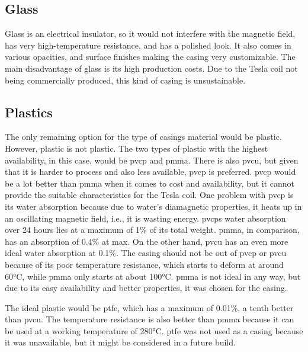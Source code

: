 \subsection{Glass}

Glass is an electrical insulator, so it would not interfere with the magnetic field, has very high-temperature resistance, and has a polished look. It also comes in various opacities, and surface finishes making the casing very customizable. The main disadvantage of glass is its high production costs. Due to the Tesla coil not being commercially produced, this kind of casing is unsustainable.

\subsection{Plastics}

The only remaining option for the type of casings material would be plastic. However, plastic is not plastic. The two types of plastic with the highest availability, in this case, would be \gls{pvcp} and \gls{pmma}. There is also \gls{pvcu}, but given that it is harder to process and also less available, \gls{pvcp} is preferred. \gls{pvcp} would be a lot better than \gls{pmma} when it comes to cost and availability, but it cannot provide the suitable characteristics for the Tesla coil. One problem with \gls{pvcp} is its water absorption because due to water's diamagnetic properties, it heats up in an oscillating magnetic field, i.e., it is wasting energy. \gls{pvcp}s water absorption over 24 hours lies at a maximum of 1\% of its total weight. \gls{pmma}, in comparison, has an absorption of 0.4\% at max. On the other hand, \gls{pvcu} has an even more ideal water absorption at 0.1\%. The casing should not be out of \gls{pvcp} or \gls{pvcu} because of its poor temperature resistance, which starts to deform at around 60°C, while \gls{pmma} only starts at about 100°C. \gls{pmma} is not ideal in any way, but due to its easy availability and better properties, it was chosen for the casing. 

The ideal plastic would be \gls{ptfe}, which has a maximum of 0.01\%, a tenth better than \gls{pvcu}. The temperature resistance is also better than \gls{pmma} because it can be used at a working temperature of 280°C. \gls{ptfe} was not used as a casing because it was unavailable, but it might be considered in a future build.  

